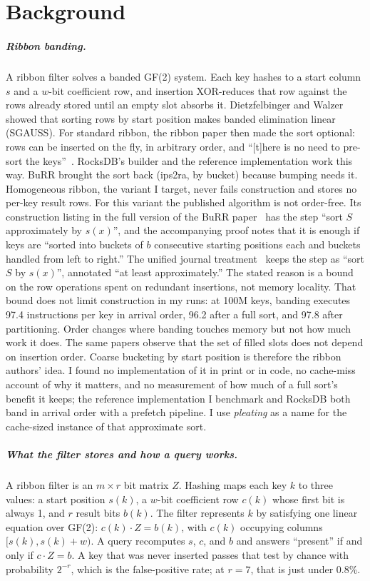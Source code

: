 \documentclass[a4paper,UKenglish,cleveref,autoref,thm-restate,anonymous]{lipics-v2021}
\begin{document}
\section{Background}\label{sec:background}
\subparagraph*{Ribbon banding.} A ribbon filter solves a banded GF(2) system. Each key hashes to a start column $s$ and a $w$-bit coefficient row, and insertion XOR-reduces that row against the rows already stored until an empty slot absorbs it. Dietzfelbinger and Walzer showed that sorting rows by start position makes banded elimination linear (SGAUSS). For standard ribbon, the ribbon paper then made the sort optional: rows can be inserted on the fly, in arbitrary order, and ``[t]here is no need to pre-sort the keys''~\cite{dillinger2021ribbon}. RocksDB's builder and the reference implementation work this way. BuRR brought the sort back (ips2ra, by bucket) because bumping needs it. Homogeneous ribbon, the variant I target, never fails construction and stores no per-key result rows. For this variant the published algorithm is not order-free. Its construction listing in the full version of the BuRR paper~\cite{dillinger2021burrtr} has the step ``sort $S$ approximately by $s(x)$'', and the accompanying proof notes that it is enough if keys are ``sorted into buckets of $b$ consecutive starting positions each and buckets handled from left to right.'' The unified journal treatment~\cite{dietzfelbinger2026ribbon} keeps the step as ``sort $S$ by $s(x)$'', annotated ``at least approximately.'' The stated reason is a bound on the row operations spent on redundant insertions, not memory locality. That bound does not limit construction in my runs: at 100M keys, banding executes 97.4 instructions per key in arrival order, 96.2 after a full sort, and 97.8 after partitioning. Order changes where banding touches memory but not how much work it does. The same papers observe that the set of filled slots does not depend on insertion order. Coarse bucketing by start position is therefore the ribbon authors' idea. I found no implementation of it in print or in code, no cache-miss account of why it matters, and no measurement of how much of a full sort's benefit it keeps; the reference implementation I benchmark and RocksDB both band in arrival order with a prefetch pipeline. I use \emph{pleating} as a name for the cache-sized instance of that approximate sort.

\subparagraph*{What the filter stores and how a query works.} A ribbon filter is an $m \times r$ bit matrix $Z$. Hashing maps each key $k$ to three values: a start position $s(k)$, a $w$-bit coefficient row $c(k)$ whose first bit is always 1, and $r$ result bits $b(k)$. The filter represents $k$ by satisfying one linear equation over GF(2): $c(k)\cdot Z = b(k)$, with $c(k)$ occupying columns $[s(k), s(k){+}w)$. A query recomputes $s$, $c$, and $b$ and answers ``present'' if and only if $c\cdot Z = b$. A key that was never inserted passes that test by chance with probability $2^{-r}$, which is the false-positive rate; at $r = 7$, that is just under 0.8\%.
\end{document}
